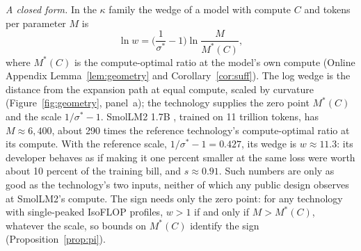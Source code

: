 \textit{A closed form.} In the $\kappa$ family the wedge of a model with compute $C$ and tokens per parameter $M$ is
\begin{equation}\label{eq:wM}
\ln w=\Big(\frac1{\sigma^*}-1\Big)\ln\frac{M}{M^*(C)},
\end{equation}
where $M^*(C)$ is the compute-optimal ratio at the model's own compute (Online Appendix Lemma~\ref{lem:geometry} and
Corollary~\ref{cor:suff}). The log wedge is the distance from the expansion path at equal compute, scaled by curvature
(Figure~\ref{fig:geometry}, panel~a); the technology supplies the zero point $M^*(C)$ and the scale $1/\sigma^*-1$.
SmolLM2 1.7B \citep{benallal2025smollm2}, trained on 11 trillion tokens, has
$M\approx6{,}400$, about 290 times the reference technology's compute-optimal ratio at its compute. With the reference
scale, $1/\sigma^*-1=0.427$, its wedge is $w\approx11.3$: its developer behaves as if making it one percent smaller at
the same loss were worth about 10 percent of the training bill, and $s\approx0.91$. Such numbers are only as good as
the technology's two inputs, neither of which any public design observes at SmolLM2's compute. The sign needs only the
zero point: for any technology with single-peaked IsoFLOP profiles, $w>1$ if and only if $M>M^*(C)$, whatever the
scale, so bounds on $M^*(C)$ identify the sign (Proposition~\ref{prop:pi}).
